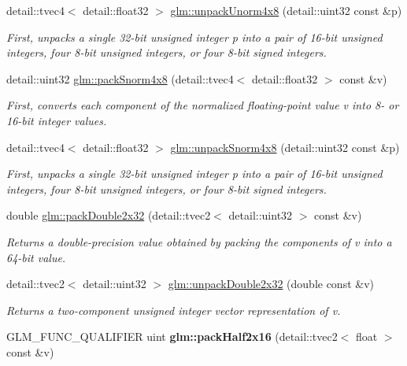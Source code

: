 \begin{DoxyCompactItemize}
detail\-::tvec4$<$ detail\-::float32 $>$ \hyperlink{group__core__func__packing_ga88febf67bc78f5ad96735b0ca9cbb073}{glm\-::unpack\-Unorm4x8} (detail\-::uint32 const \&p)
\begin{DoxyCompactList}\small\item\em First, unpacks a single 32-\/bit unsigned integer p into a pair of 16-\/bit unsigned integers, four 8-\/bit unsigned integers, or four 8-\/bit signed integers. \end{DoxyCompactList}\item 
detail\-::uint32 \hyperlink{group__core__func__packing_ga642b59fa9588eee81bea2f35e1556aae}{glm\-::pack\-Snorm4x8} (detail\-::tvec4$<$ detail\-::float32 $>$ const \&v)
\begin{DoxyCompactList}\small\item\em First, converts each component of the normalized floating-\/point value v into 8-\/ or 16-\/bit integer values. \end{DoxyCompactList}\item 
detail\-::tvec4$<$ detail\-::float32 $>$ \hyperlink{group__core__func__packing_ga9a43a9dd70403585d73627ddec6a85ff}{glm\-::unpack\-Snorm4x8} (detail\-::uint32 const \&p)
\begin{DoxyCompactList}\small\item\em First, unpacks a single 32-\/bit unsigned integer p into a pair of 16-\/bit unsigned integers, four 8-\/bit unsigned integers, or four 8-\/bit signed integers. \end{DoxyCompactList}\item 
double \hyperlink{group__core__func__packing_ga3b29a2a13aeb1e9118d4a7f03597228e}{glm\-::pack\-Double2x32} (detail\-::tvec2$<$ detail\-::uint32 $>$ const \&v)
\begin{DoxyCompactList}\small\item\em Returns a double-\/precision value obtained by packing the components of v into a 64-\/bit value. \end{DoxyCompactList}\item 
detail\-::tvec2$<$ detail\-::uint32 $>$ \hyperlink{group__core__func__packing_gaf1e3ad4a924977b175913ed935958b71}{glm\-::unpack\-Double2x32} (double const \&v)
\begin{DoxyCompactList}\small\item\em Returns a two-\/component unsigned integer vector representation of v. \end{DoxyCompactList}\item 
\hypertarget{namespaceglm_af8aa8303c4d1547b8a847620045e31f8}{G\-L\-M\-\_\-\-F\-U\-N\-C\-\_\-\-Q\-U\-A\-L\-I\-F\-I\-E\-R uint {\bfseries glm\-::pack\-Half2x16} (detail\-::tvec2$<$ float $>$ const \&v)}\label{namespaceglm_af8aa8303c4d1547b8a847620045e31f8}


\end{DoxyCompactItemize}

